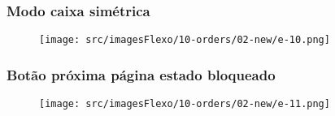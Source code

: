 \newpage
\thispagestyle{fancy}
\vspace*{\fill}
\subsubsection{\small{Modo caixa simétrica}}
\begin{figure}[h]
  \centering
  \texttt{[image: src/imagesFlexo/10-orders/02-new/e-10.png]}
\end{figure}
\vspace*{\fill}

\newpage
\thispagestyle{fancy}
\vspace*{\fill}
\subsubsection{\small{Botão próxima página estado bloqueado}}
\begin{figure}[h]
  \centering
  \texttt{[image: src/imagesFlexo/10-orders/02-new/e-11.png]}
\end{figure}
\vspace*{\fill}